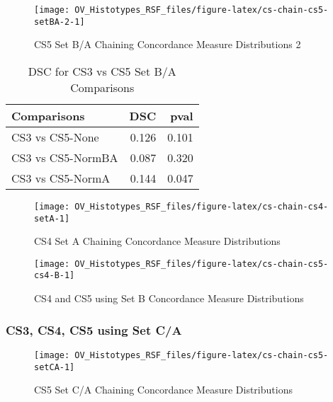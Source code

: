 \documentclass[
]{report}
\begin{document}
\begin{figure}[H]

{\centering \texttt{[image: OV\_Histotypes\_RSF\_files/figure-latex/cs-chain-cs5-setBA-2-1]} 

}

\caption{CS5 Set B/A Chaining Concordance  Measure Distributions 2}\label{fig:cs-chain-cs5-setBA-2}
\end{figure}

\begin{table}

\caption{\label{tab:cs35-BA-dsc}DSC for CS3 vs CS5 Set B/A Comparisons}
\centering
\begin{tabular}[t]{l|r|r}
\hline
Comparisons & DSC & pval\\
\hline
CS3 vs CS5-None & 0.126 & 0.101\\
\hline
CS3 vs CS5-NormBA & 0.087 & 0.320\\
\hline
CS3 vs CS5-NormA & 0.144 & 0.047\\
\hline
\end{tabular}
\end{table}

\begin{figure}[H]

{\centering \texttt{[image: OV\_Histotypes\_RSF\_files/figure-latex/cs-chain-cs4-setA-1]} 

}

\caption{CS4 Set A Chaining Concordance Measure Distributions}\label{fig:cs-chain-cs4-setA}
\end{figure}

\begin{figure}[H]

{\centering \texttt{[image: OV\_Histotypes\_RSF\_files/figure-latex/cs-chain-cs5-cs4-B-1]} 

}

\caption{CS4 and CS5 using Set B Concordance Measure Distributions}\label{fig:cs-chain-cs5-cs4-B}
\end{figure}

\hypertarget{cs3-cs4-cs5-using-set-ca}{%
\subsubsection{CS3, CS4, CS5 using Set C/A}\label{cs3-cs4-cs5-using-set-ca}}

\begin{figure}[H]

{\centering \texttt{[image: OV\_Histotypes\_RSF\_files/figure-latex/cs-chain-cs5-setCA-1]} 

}

\caption{CS5 Set C/A Chaining Concordance  Measure Distributions}\label{fig:cs-chain-cs5-setCA}
\end{figure}
\end{document}
